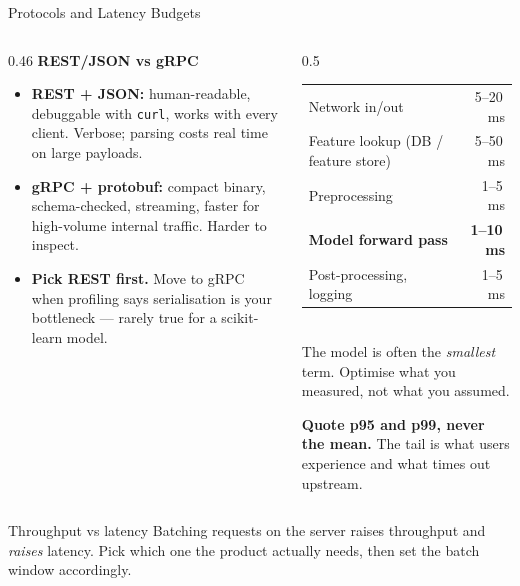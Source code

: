 
\begin{frame}{Protocols and Latency Budgets}

    \begin{columns}[T]
        \begin{column}{0.46\textwidth}
            \small
            \textbf{REST/JSON vs gRPC}
            \begin{itemize}
                \item \textbf{REST + JSON:} human-readable, debuggable with \texttt{curl}, works with every
                      client. Verbose; parsing costs real time on large payloads.
                \item \textbf{gRPC + protobuf:} compact binary, schema-checked, streaming, faster for
                      high-volume internal traffic. Harder to inspect.
                \item \textbf{Pick REST first.} Move to gRPC when profiling says serialisation is your
                      bottleneck --- rarely true for a scikit-learn model.
            \end{itemize}
        \end{column}
        \begin{column}{0.5\textwidth}
            \begin{tcolorbox}[colback=blue!5, colframe=blue!50, title=\small Budget the whole request]
                \scriptsize
                \begin{tabular}{lr}
                    Network in/out        & 5--20\,ms \\
                    Feature lookup (DB / feature store) & 5--50\,ms \\
                    Preprocessing         & 1--5\,ms \\
                    \textbf{Model forward pass} & \textbf{1--10\,ms} \\
                    Post-processing, logging & 1--5\,ms \\
                \end{tabular}
                \vspace{0.4em}
                \\ The model is often the \emph{smallest} term. Optimise what you measured, not what you
                assumed.
            \end{tcolorbox}
            \vspace{0.4em}
            \small \textbf{Quote p95 and p99, never the mean.} The tail is what users experience and what
            times out upstream.
        \end{column}
    \end{columns}

    \vspace{0.5em}
    \begin{block}{Throughput vs latency}
        \small Batching requests on the server raises throughput and \emph{raises} latency. Pick which one
        the product actually needs, then set the batch window accordingly.
    \end{block}

\end{frame}
